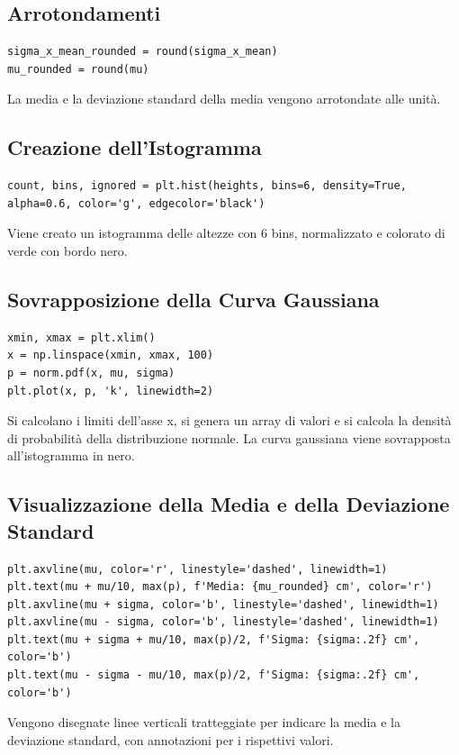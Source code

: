 \documentclass[a4paper,12pt]{article}
\begin{document}
\subsection{Arrotondamenti}
\begin{lstlisting}
sigma_x_mean_rounded = round(sigma_x_mean)
mu_rounded = round(mu)
\end{lstlisting}
La media e la deviazione standard della media vengono arrotondate alle unità.

\subsection{Creazione dell'Istogramma}
\begin{lstlisting}
count, bins, ignored = plt.hist(heights, bins=6, density=True, alpha=0.6, color='g', edgecolor='black')
\end{lstlisting}
Viene creato un istogramma delle altezze con 6 bins, normalizzato e colorato di verde con bordo nero.

\subsection{Sovrapposizione della Curva Gaussiana}
\begin{lstlisting}
xmin, xmax = plt.xlim()
x = np.linspace(xmin, xmax, 100)
p = norm.pdf(x, mu, sigma)
plt.plot(x, p, 'k', linewidth=2)
\end{lstlisting}
Si calcolano i limiti dell'asse x, si genera un array di valori e si calcola la densità di probabilità della distribuzione normale. La curva gaussiana viene sovrapposta all'istogramma in nero.

\subsection{Visualizzazione della Media e della Deviazione Standard}
\begin{lstlisting}
plt.axvline(mu, color='r', linestyle='dashed', linewidth=1)
plt.text(mu + mu/10, max(p), f'Media: {mu_rounded} cm', color='r')
plt.axvline(mu + sigma, color='b', linestyle='dashed', linewidth=1)
plt.axvline(mu - sigma, color='b', linestyle='dashed', linewidth=1)
plt.text(mu + sigma + mu/10, max(p)/2, f'Sigma: {sigma:.2f} cm', color='b')
plt.text(mu - sigma - mu/10, max(p)/2, f'Sigma: {sigma:.2f} cm', color='b')
\end{lstlisting}
Vengono disegnate linee verticali tratteggiate per indicare la media e la deviazione standard, con annotazioni per i rispettivi valori.
\end{document}
